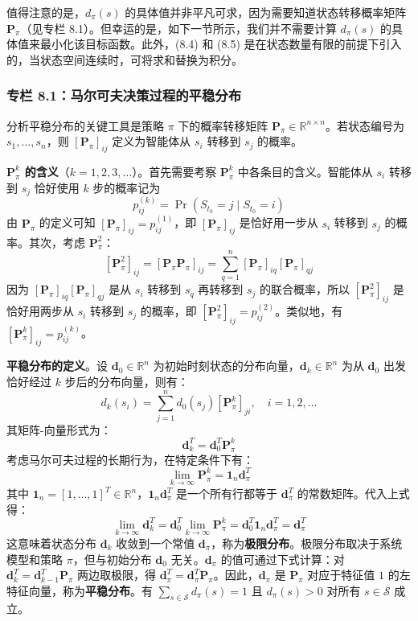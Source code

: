 \documentclass[UTF8]{article}
\begin{document}
值得注意的是，$d_\pi(s)$ 的具体值并非平凡可求，因为需要知道状态转移概率矩阵 $\boldsymbol{P}_\pi$（见专栏 8.1）。但幸运的是，如下一节所示，我们并不需要计算 $d_\pi(s)$ 的具体值来最小化该目标函数。此外，(8.4) 和 (8.5) 是在状态数量有限的前提下引入的，当状态空间连续时，可将求和替换为积分。

\subsubsection*{专栏 8.1：马尔可夫决策过程的平稳分布}

分析平稳分布的关键工具是策略 $\pi$ 下的概率转移矩阵 $\boldsymbol{P}_\pi \in \mathbb{R}^{n \times n}$。若状态编号为 $s_1, \dots, s_n$，则 $[\boldsymbol{P}_\pi]_{ij}$ 定义为智能体从 $s_i$ 转移到 $s_j$ 的概率。

\textbf{$\boldsymbol{P}_\pi^k$ 的含义}（$k = 1, 2, 3, \dots$）。首先需要考察 $\boldsymbol{P}_\pi^k$ 中各条目的含义。智能体从 $s_i$ 转移到 $s_j$ 恰好使用 $k$ 步的概率记为
\[
p_{ij}^{(k)} = \Pr(S_{t_k} = j \mid S_{t_0} = i)
\]
由 $\boldsymbol{P}_\pi$ 的定义可知 $[\boldsymbol{P}_\pi]_{ij} = p_{ij}^{(1)}$，即 $[\boldsymbol{P}_\pi]_{ij}$ 是恰好用一步从 $s_i$ 转移到 $s_j$ 的概率。其次，考虑 $\boldsymbol{P}_\pi^2$：
\[
[\boldsymbol{P}_\pi^2]_{ij} = [\boldsymbol{P}_\pi \boldsymbol{P}_\pi]_{ij} = \sum_{q=1}^n [\boldsymbol{P}_\pi]_{iq} [\boldsymbol{P}_\pi]_{qj}
\]
因为 $[\boldsymbol{P}_\pi]_{iq}[\boldsymbol{P}_\pi]_{qj}$ 是从 $s_i$ 转移到 $s_q$ 再转移到 $s_j$ 的联合概率，所以 $[\boldsymbol{P}_\pi^2]_{ij}$ 是恰好用两步从 $s_i$ 转移到 $s_j$ 的概率，即 $[\boldsymbol{P}_\pi^2]_{ij} = p_{ij}^{(2)}$。类似地，有 $[\boldsymbol{P}_\pi^k]_{ij} = p_{ij}^{(k)}$。

\textbf{平稳分布的定义}。设 $\boldsymbol{d}_0 \in \mathbb{R}^n$ 为初始时刻状态的分布向量，$\boldsymbol{d}_k \in \mathbb{R}^n$ 为从 $\boldsymbol{d}_0$ 出发恰好经过 $k$ 步后的分布向量，则有：
\[
d_k(s_i) = \sum_{j=1}^n d_0(s_j) [\boldsymbol{P}_\pi^k]_{ji}, \quad i = 1, 2, \dots
\]
其矩阵-向量形式为：
\[
\boldsymbol{d}_k^T = \boldsymbol{d}_0^T \boldsymbol{P}_\pi^k
\]
考虑马尔可夫过程的长期行为，在特定条件下有：
\[
\lim_{k \to \infty} \boldsymbol{P}_\pi^k = \boldsymbol{1}_n \boldsymbol{d}_\pi^T
\]
其中 $\boldsymbol{1}_n = [1, \dots, 1]^T \in \mathbb{R}^n$，$\boldsymbol{1}_n \boldsymbol{d}_\pi^T$ 是一个所有行都等于 $\boldsymbol{d}_\pi^T$ 的常数矩阵。代入上式得：
\[
\lim_{k \to \infty} \boldsymbol{d}_k^T = \boldsymbol{d}_0^T \lim_{k \to \infty} \boldsymbol{P}_\pi^k = \boldsymbol{d}_0^T \boldsymbol{1}_n \boldsymbol{d}_\pi^T = \boldsymbol{d}_\pi^T
\]
这意味着状态分布 $\boldsymbol{d}_k$ 收敛到一个常值 $\boldsymbol{d}_\pi$，称为\textbf{极限分布}。极限分布取决于系统模型和策略 $\pi$，但与初始分布 $\boldsymbol{d}_0$ 无关。$\boldsymbol{d}_\pi$ 的值可通过下式计算：对 $\boldsymbol{d}_k^T = \boldsymbol{d}_{k-1}^T \boldsymbol{P}_\pi$ 两边取极限，得 $\boldsymbol{d}_\pi^T = \boldsymbol{d}_\pi^T \boldsymbol{P}_\pi$。因此，$\boldsymbol{d}_\pi$ 是 $\boldsymbol{P}_\pi$ 对应于特征值 $1$ 的左特征向量，称为\textbf{平稳分布}。有 $\sum_{s \in \mathcal{S}} d_\pi(s) = 1$ 且 $d_\pi(s) > 0$ 对所有 $s \in \mathcal{S}$ 成立。
\end{document}
